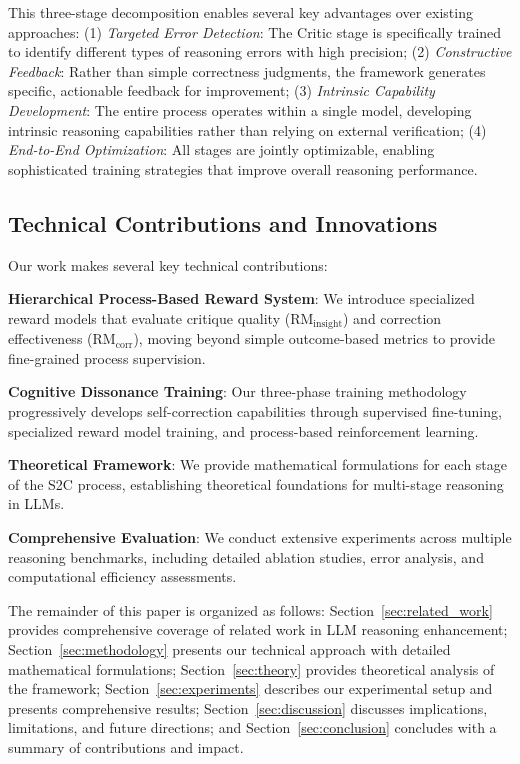 \documentclass[10pt,twocolumn]{article}
\newcommand{\ssc}{\textsc{S2C}}
\newcommand{\RMinsight}{\text{RM}_{\text{insight}}}
\newcommand{\RMcorr}{\text{RM}_{\text{corr}}}
\begin{document}
This three-stage decomposition enables several key advantages over existing approaches: (1) \textit{Targeted Error Detection}: The Critic stage is specifically trained to identify different types of reasoning errors with high precision; (2) \textit{Constructive Feedback}: Rather than simple correctness judgments, the framework generates specific, actionable feedback for improvement; (3) \textit{Intrinsic Capability Development}: The entire process operates within a single model, developing intrinsic reasoning capabilities rather than relying on external verification; (4) \textit{End-to-End Optimization}: All stages are jointly optimizable, enabling sophisticated training strategies that improve overall reasoning performance.

\subsection{Technical Contributions and Innovations}

Our work makes several key technical contributions:

\textbf{Hierarchical Process-Based Reward System}: We introduce specialized reward models that evaluate critique quality ($\RMinsight$) and correction effectiveness ($\RMcorr$), moving beyond simple outcome-based metrics to provide fine-grained process supervision.

\textbf{Cognitive Dissonance Training}: Our three-phase training methodology progressively develops self-correction capabilities through supervised fine-tuning, specialized reward model training, and process-based reinforcement learning.

\textbf{Theoretical Framework}: We provide mathematical formulations for each stage of the \ssc{} process, establishing theoretical foundations for multi-stage reasoning in LLMs.

\textbf{Comprehensive Evaluation}: We conduct extensive experiments across multiple reasoning benchmarks, including detailed ablation studies, error analysis, and computational efficiency assessments.

The remainder of this paper is organized as follows: Section~\ref{sec:related_work} provides comprehensive coverage of related work in LLM reasoning enhancement; Section~\ref{sec:methodology} presents our technical approach with detailed mathematical formulations; Section~\ref{sec:theory} provides theoretical analysis of the framework; Section~\ref{sec:experiments} describes our experimental setup and presents comprehensive results; Section~\ref{sec:discussion} discusses implications, limitations, and future directions; and Section~\ref{sec:conclusion} concludes with a summary of contributions and impact.
\end{document}
